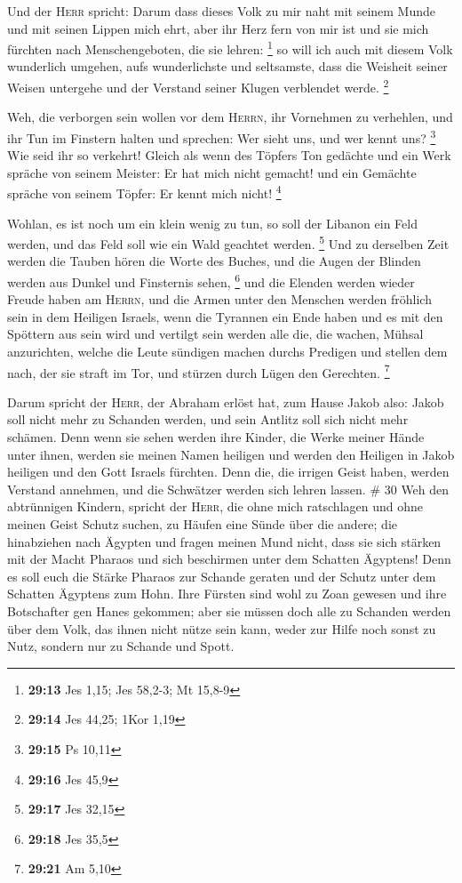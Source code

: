 Und der \textsc{Herr} spricht: Darum dass dieses Volk zu
mir naht mit seinem Munde und mit seinen Lippen mich ehrt, aber ihr Herz
fern von mir ist und sie mich fürchten nach Menschengeboten, die sie
lehren: \footnote{\textbf{29:13} Jes 1,15; Jes 58,2-3; Mt 15,8-9}
 so will ich auch mit diesem Volk wunderlich umgehen,
aufs wunderlichste und seltsamste, dass die Weisheit seiner Weisen
untergehe und der Verstand seiner Klugen verblendet werde. \footnote{\textbf{29:14}
  Jes 44,25; 1Kor 1,19}

 Weh, die verborgen sein wollen vor dem \textsc{Herrn},
ihr Vornehmen zu verhehlen, und ihr Tun im Finstern halten und sprechen:
Wer sieht uns, und wer kennt uns? \footnote{\textbf{29:15} Ps 10,11}
 Wie seid ihr so verkehrt! Gleich als wenn des Töpfers
Ton gedächte und ein Werk spräche von seinem Meister: Er hat mich nicht
gemacht! und ein Gemächte spräche von seinem Töpfer: Er kennt mich
nicht! \footnote{\textbf{29:16} Jes 45,9}

 Wohlan, es ist noch um ein klein wenig zu tun, so soll
der Libanon ein Feld werden, und das Feld soll wie ein Wald geachtet
werden. \footnote{\textbf{29:17} Jes 32,15}  Und zu
derselben Zeit werden die Tauben hören die Worte des Buches, und die
Augen der Blinden werden aus Dunkel und Finsternis sehen, \footnote{\textbf{29:18}
  Jes 35,5}  und die Elenden werden wieder Freude haben
am \textsc{Herrn}, und die Armen unter den Menschen werden fröhlich sein
in dem Heiligen Israels,  wenn die Tyrannen ein Ende
haben und es mit den Spöttern aus sein wird und vertilgt sein werden
alle die, die wachen, Mühsal anzurichten,  welche die
Leute sündigen machen durchs Predigen und stellen dem nach, der sie
straft im Tor, und stürzen durch Lügen den Gerechten. \footnote{\textbf{29:21}
  Am 5,10}

 Darum spricht der \textsc{Herr}, der Abraham erlöst hat,
zum Hause Jakob also: Jakob soll nicht mehr zu Schanden werden, und sein
Antlitz soll sich nicht mehr schämen.  Denn wenn sie
sehen werden ihre Kinder, die Werke meiner Hände unter ihnen, werden sie
meinen Namen heiligen und werden den Heiligen in Jakob heiligen und den
Gott Israels fürchten.  Denn die, die irrigen Geist
haben, werden Verstand annehmen, und die Schwätzer werden sich lehren
lassen. \# 30  Weh den abtrünnigen Kindern, spricht der
\textsc{Herr}, die ohne mich ratschlagen und ohne meinen Geist Schutz
suchen, zu Häufen eine Sünde über die andere;  die
hinabziehen nach Ägypten und fragen meinen Mund nicht, dass sie sich
stärken mit der Macht Pharaos und sich beschirmen unter dem Schatten
Ägyptens!  Denn es soll euch die Stärke Pharaos zur
Schande geraten und der Schutz unter dem Schatten Ägyptens zum Hohn.
 Ihre Fürsten sind wohl zu Zoan gewesen und ihre
Botschafter gen Hanes gekommen;  aber sie müssen doch alle
zu Schanden werden über dem Volk, das ihnen nicht nütze sein kann, weder
zur Hilfe noch sonst zu Nutz, sondern nur zu Schande und Spott.

